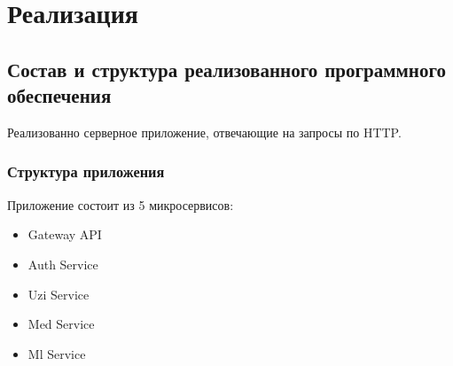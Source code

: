 \chapter{Реализация}






% 


\section{Состав и структура реализованного программного обеспечения}

Реализованно серверное приложение, отвечающие на запросы по HTTP.

\subsection{Структура приложения}
Приложение состоит из 5 микросервисов:
\begin{itemize}
  \item Gateway API
  \item Auth Service
  \item Uzi Service
  \item Med Service
  \item Ml Service
\end{itemize}

